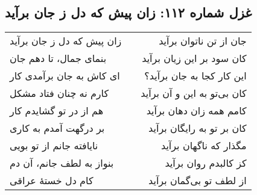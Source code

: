 \begin{center}
\section*{غزل شماره ۱۱۲: زان پیش که دل ز جان برآید}
\label{sec:112}
\begin{longtable}{l p{0.5cm} r}
زان پیش که دل ز جان برآید
&&
جان از تن ناتوان برآید
\\
بنمای جمال، تا دهم جان
&&
کان سود بر این زیان برآید
\\
ای کاش به جان برآمدی کار
&&
این کار کجا به جان برآید؟
\\
کارم نه چنان فتاد مشکل
&&
کان بی‌تو به این و آن برآید
\\
هم از در تو گشایدم کار
&&
کامم همه زان دهان برآید
\\
بر درگهت آمدم به کاری
&&
کان بر تو به رایگان برآید
\\
نایافته جانم از تو بویی
&&
مگذار که ناگهان برآید
\\
بنواز به لطف جانم، آن دم
&&
کز کالبدم روان برآید
\\
کام دل خستهٔ عراقی
&&
از لطف تو بی‌گمان برآید
\\
\end{longtable}
\end{center}
